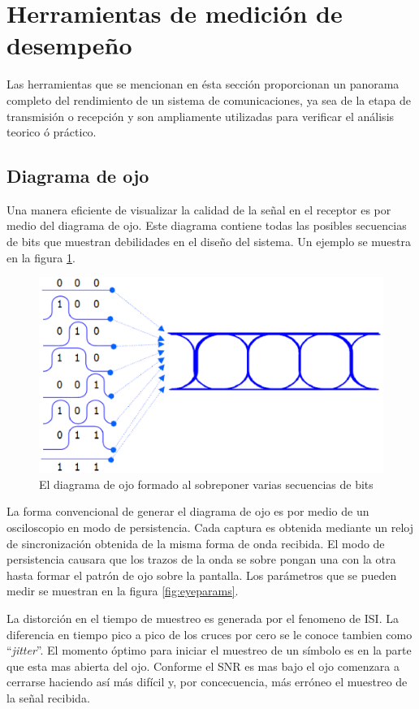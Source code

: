 \section{Herramientas de medici\'on de desempe\~no}
Las herramientas que se mencionan en \'esta secci\'on proporcionan un panorama completo del
rendimiento de un sistema de comunicaciones, ya sea de la etapa de transmisi\'on o recepci\'on y
son ampliamente utilizadas para verificar el an\'alisis teorico \'o pr\'actico.

\subsection{Diagrama de ojo}
Una manera eficiente de visualizar la calidad de la se\~nal en el receptor es por medio del diagrama
de ojo. Este diagrama contiene todas las posibles secuencias de bits que muestran debilidades en el
dise\~no del sistema. Un ejemplo se muestra en la figura \ref{fig:eyeform}\cite{foster}.

\begin{figure}[htp]
\centering
	\includegraphics[width=5.5in]{figs/eyeform}
	\caption{El diagrama de ojo formado al sobreponer varias secuencias de bits}
	\label{fig:eyeform}
\end{figure}

La forma convencional de generar el diagrama de ojo es por medio de un osciloscopio en modo de
persistencia. Cada captura es obtenida mediante un reloj de sincronizaci\'on obtenida de la misma
forma de onda recibida. El modo de persistencia causara que los trazos de la onda se sobre pongan
una con la otra hasta formar el patr\'on de ojo sobre la pantalla. Los par\'ametros que se pueden
medir se muestran en la figura \ref{fig:eyeparams}\cite{breed}.

La distorci\'on en el tiempo de muestreo es generada por el fenomeno de ISI. La diferencia en
tiempo pico a pico de los cruces por cero se le conoce tambien como ``\emph{jitter}''. El momento
\'optimo para iniciar el muestreo de un s\'imbolo es en la parte que esta mas abierta del ojo. Conforme el
SNR es mas bajo el ojo comenzara a cerrarse haciendo as\'i m\'as dif\'icil y, por concecuencia,
m\'as err\'oneo el muestreo de la se\~nal recibida.

